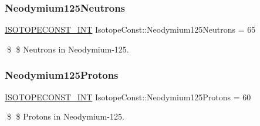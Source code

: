 \subsubsection{\texorpdfstring{Neodymium125\+Neutrons}{Neodymium125Neutrons}}
{\footnotesize\ttfamily \mbox{\hyperlink{group___isotope_const-_macros_ga5f18360b3e99483a35c32d789e62621c}{I\+S\+O\+T\+O\+P\+E\+C\+O\+N\+S\+T\+\_\+\+I\+NT}} Isotope\+Const\+::\+Neodymium125\+Neutrons = 65}

\$ \$ Neutrons in Neodymium-\/125. \mbox{\label{group___isotope_const-_neodymium-_nd125_ga2877bfc4bfeae8778db0f81ef4450221}} 
\subsubsection{\texorpdfstring{Neodymium125\+Protons}{Neodymium125Protons}}
{\footnotesize\ttfamily \mbox{\hyperlink{group___isotope_const-_macros_ga5f18360b3e99483a35c32d789e62621c}{I\+S\+O\+T\+O\+P\+E\+C\+O\+N\+S\+T\+\_\+\+I\+NT}} Isotope\+Const\+::\+Neodymium125\+Protons = 60}

\$ \$ Protons in Neodymium-\/125. 